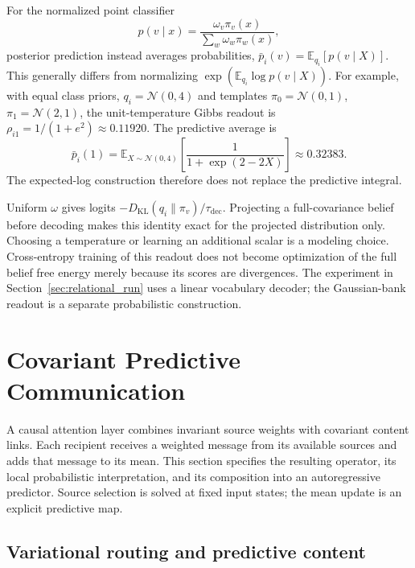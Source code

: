 \documentclass[twoside,11pt]{article}
\begin{document}
For the normalized point classifier
\begin{equation}
p(v\mid x)=\frac{\omega_v\pi_v(x)}
{\sum_w\omega_w\pi_w(x)},
\label{eq:supp_token_likelihood}
\end{equation}
posterior prediction instead averages probabilities,
$\bar p_i(v)=\mathbb E_{q_i}[p(v\mid X)]$. This generally differs from normalizing $\exp(\mathbb E_{q_i}\log p(v\mid X))$. For example, with equal class priors, $q_i=\mathcal N(0,4)$ and templates $\pi_0=\mathcal N(0,1)$, $\pi_1=\mathcal N(2,1)$, the unit-temperature Gibbs readout is $\rho_{i1}=1/(1+e^2)\approx0.11920$. The predictive average is
\begin{equation}
\bar p_i(1)=\mathbb E_{X\sim\mathcal N(0,4)}
\left[\frac{1}{1+\exp(2-2X)}\right]\approx0.32383.
\end{equation}
The expected-log construction therefore does not replace the predictive integral.

Uniform $\omega$ gives logits $-D_{\mathrm{KL}}(q_i\|\pi_v)/\tau_{\mathrm{dec}}$. Projecting a full-covariance belief before decoding makes this identity exact for the projected distribution only. Choosing a temperature or learning an additional scalar is a modeling choice. Cross-entropy training of this readout does not become optimization of the full belief free energy merely because its scores are divergences. The experiment in Section~\ref{sec:relational_run} uses a linear vocabulary decoder; the Gaussian-bank readout is a separate probabilistic construction.

\section{Covariant Predictive Communication}
\label{sec:relational_communication}
A causal attention layer combines invariant source weights with covariant content links. Each recipient receives a weighted message from its available sources and adds that message to its mean. This section specifies the resulting operator, its local probabilistic interpretation, and its composition into an autoregressive predictor. Source selection is solved at fixed input states; the mean update is an explicit predictive map.

\subsection{Variational routing and predictive content}
\end{document}
